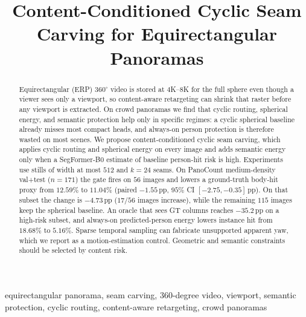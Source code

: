 \documentclass[conference,a4paper]{IEEEtran}
\title{Content-Conditioned Cyclic Seam Carving for Equirectangular Panoramas}
\author{\IEEEauthorblockN{Anonymous Authors}
\IEEEauthorblockA{Affiliation withheld for double-blind review}}
\begin{document}
\maketitle

\begin{abstract}
Equirectangular (ERP) $360^\circ$ video is stored at
$4$K--$8$K for the full sphere even though a viewer sees only a
viewport, so content-aware retargeting can shrink that raster
before any viewport is extracted. On crowd panoramas we find
that cyclic routing, spherical energy, and semantic protection
help only in specific regimes: a cyclic spherical baseline
already misses most compact heads, and always-on person
protection is therefore wasted on most scenes. We propose
content-conditioned cyclic seam carving, which applies cyclic
routing and spherical energy on every image and adds semantic
energy only when a SegFormer-B0 estimate of baseline person-hit
risk is high. Experiments use stills of width at most $512$ and
$k=24$ seams. On PanoCount medium-density val+test ($n=171$) the
gate fires on $56$ images and lowers a ground-truth body-hit
proxy from $12.59\%$ to $11.04\%$ (paired $-1.55$\,pp, $95\%$ CI
$[-2.75,-0.35]$\,pp). On that subset the change is $-4.73$\,pp
($17/56$ images increase), while the remaining $115$ images keep
the spherical baseline. An oracle that sees GT columns reaches
$-35.2$\,pp on a high-risk subset, and always-on
predicted-person energy lowers instance hit from $18.68\%$ to
$5.16\%$. Sparse temporal sampling can fabricate unsupported
apparent yaw, which we report as a motion-estimation control.
Geometric and semantic constraints should be selected by content
risk.
\end{abstract}

\begin{IEEEkeywords}
equirectangular panorama, seam carving, 360-degree video, viewport,
semantic protection, cyclic routing, content-aware retargeting,
crowd panoramas
\end{IEEEkeywords}












\end{document}
